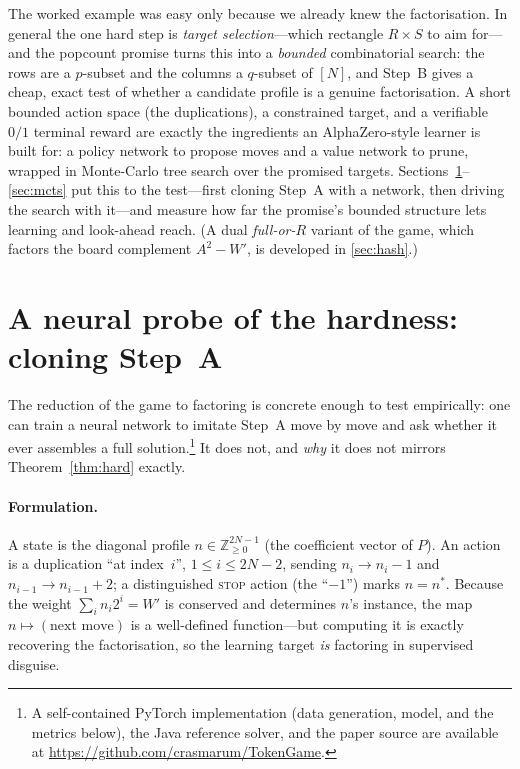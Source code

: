 \documentclass[11pt]{article}
\theoremstyle{definition}
\theoremstyle{plain}
\theoremstyle{remark}
\newcommand{\Z}{\mathbb{Z}}
\begin{document}
The worked example was easy only because we already knew the factorisation. In general the
one hard step is \emph{target selection}---which rectangle $R\times S$ to aim for---and the
popcount promise turns this into a \emph{bounded} combinatorial search: the rows are a
$p$-subset and the columns a $q$-subset of $[N]$, and Step~B gives a cheap, exact test of
whether a candidate profile is a genuine factorisation. A short bounded action space (the
duplications), a constrained target, and a verifiable $0/1$ terminal reward are exactly the
ingredients an AlphaZero-style learner is built for: a policy network to propose moves and a
value network to prune, wrapped in Monte-Carlo tree search over the promised targets.
Sections~\ref{sec:learn}--\ref{sec:mcts} put this to the test---first cloning Step~A with a
network, then driving the search with it---and measure how far the promise's bounded
structure lets learning and look-ahead reach. (A dual \emph{full-or-$R$} variant of the game,
which factors the board complement $A^2-W'$, is developed in \ref{sec:hash}.)

\section{A neural probe of the hardness: cloning Step~A}\label{sec:learn}

The reduction of the game to factoring is concrete enough to test empirically: one can train
a neural network to imitate Step~A move by move and ask whether it ever assembles a full
solution.\footnote{A self-contained PyTorch implementation (data generation, model, and the
metrics below), the Java reference solver, and the paper source are available at
\url{https://github.com/crasmarum/TokenGame}.} It does not, and \emph{why} it does not mirrors
Theorem~\ref{thm:hard} exactly.

\paragraph{Formulation.}
A state is the diagonal profile $n\in\Z_{\ge0}^{2N-1}$ (the coefficient vector of $P$). An
action is a duplication ``at index~$i$'', $1\le i\le 2N-2$, sending $n_i\to n_i-1$ and
$n_{i-1}\to n_{i-1}+2$; a distinguished \textsc{stop} action (the ``$-1$'') marks $n=n^{*}$.
Because the weight $\sum_i n_i 2^i=W'$ is conserved and determines $n$'s instance, the map
$n\mapsto(\text{next move})$ is a well-defined function---but computing it is exactly
recovering the factorisation, so the learning target \emph{is} factoring in supervised
disguise.
\end{document}
